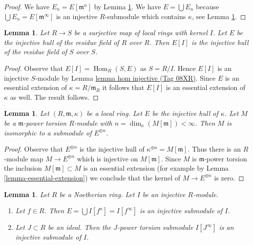 \documentclass{amsart}
\theoremstyle{plain}
\newtheorem{lemma}[subsection]{Lemma}
\theoremstyle{definition}
\theoremstyle{remark}
\numberwithin{equation}{subsection}
\def\Hom{\mathop{\mathrm{Hom}}\nolimits}
\begin{document}
\begin{proof}
We have $E_n = E[\mathfrak m^n]$ by Lemma \ref{lemma-quotient}.
We have $E = \bigcup E_n$ because $\bigcup E_n = E[\mathfrak m^\infty]$
is an injective $R$-submodule which contains $\kappa$, see
Lemma \ref{lemma-injective-module-divide}.
\end{proof}


\begin{lemma}
\label{lemma-quotient}
Let $R \to S$ be a surjective map of local rings with kernel $I$.
Let $E$ be the injective hull of the residue field of $R$ over $R$.
Then $E[I]$ is the injective hull of the residue field of $S$ over $S$.
\end{lemma}

\begin{proof}
Observe that $E[I] = \Hom_R(S, E)$ as $S = R/I$. Hence $E[I]$ is an injective
$S$-module by Lemma \href{https://stacks.math.columbia.edu/tag/08XR}{lemma hom injective (Tag 08XR)}. Since $E$ is an essential
extension of $\kappa = R/\mathfrak m_R$ it follows that $E[I]$ is an
essential extension of $\kappa$ as well. The result follows.
\end{proof}


\begin{lemma}
\label{lemma-torsion-submodule-sum-injective-hulls}
Let $(R, \mathfrak m, \kappa)$ be a local ring.
Let $E$ be the injective hull of $\kappa$.
Let $M$ be a $\mathfrak m$-power torsion $R$-module
with $n = \dim_\kappa(M[\mathfrak m]) < \infty$.
Then $M$ is isomorphic to a submodule of $E^{\oplus n}$.
\end{lemma}

\begin{proof}
Observe that $E^{\oplus n}$ is the injective hull of
$\kappa^{\oplus n} = M[\mathfrak m]$. Thus there is an $R$-module map
$M \to E^{\oplus n}$ which is injective on $M[\mathfrak m]$.
Since $M$ is $\mathfrak m$-power torsion the inclusion
$M[\mathfrak m] \subset M$ is an essential extension
(for example by Lemma \ref{lemma-essential-extension})
we conclude that the kernel of $M \to E^{\oplus n}$ is zero.
\end{proof}


\begin{lemma}
\label{lemma-injective-module-divide}
Let $R$ be a Noetherian ring. Let $I$ be an injective $R$-module.
\begin{enumerate}
\item Let $f \in R$. Then $E = \bigcup I[f^n] = I[f^\infty]$
is an injective submodule of $I$.
\item Let $J \subset R$ be an ideal. Then the $J$-power torsion
submodule $I[J^\infty]$ is an injective submodule of $I$.
\end{enumerate}
\end{lemma}
\end{document}
